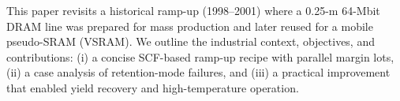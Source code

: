 This paper revisits a historical ramp-up (1998--2001) where a 0.25-\textmu m 64-Mbit DRAM line was prepared for mass production and later reused for a mobile pseudo-SRAM (VSRAM). We outline the industrial context, objectives, and contributions: (i) a concise SCF-based ramp-up recipe with parallel margin lots, (ii) a case analysis of retention-mode failures, and (iii) a practical improvement that enabled yield recovery and high-temperature operation.
